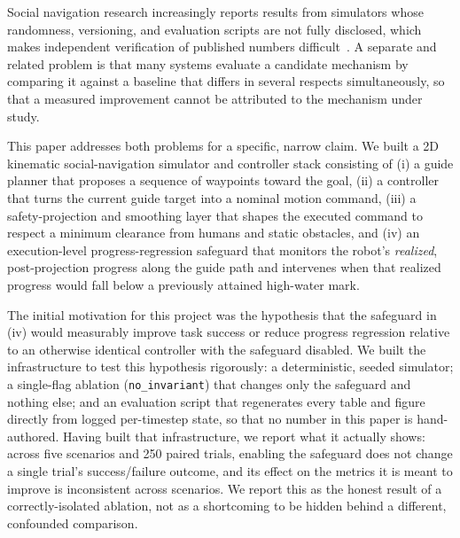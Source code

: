 \documentclass[conference,letterpaper,10pt]{ieeeconf}
\begin{document}
Social navigation research increasingly reports results from simulators
whose randomness, versioning, and evaluation scripts are not fully
disclosed, which makes independent verification of published numbers
difficult~\cite{reproducibility_crisis}. A separate and related problem is
that many systems evaluate a candidate mechanism by comparing it against a
baseline that differs in several respects simultaneously, so that a
measured improvement cannot be attributed to the mechanism under study.

This paper addresses both problems for a specific, narrow claim. We built
a 2D kinematic social-navigation simulator and controller stack consisting
of (i) a guide planner that proposes a sequence of waypoints toward the
goal, (ii) a controller that turns the current guide target into a nominal
motion command, (iii) a safety-projection and smoothing layer that shapes
the executed command to respect a minimum clearance from humans and static
obstacles, and (iv) an execution-level progress-regression safeguard that
monitors the robot's \emph{realized}, post-projection progress along the
guide path and intervenes when that realized progress would fall below a
previously attained high-water mark.

The initial motivation for this project was the hypothesis that the
safeguard in (iv) would measurably improve task success or reduce
progress regression relative to an otherwise identical controller with
the safeguard disabled. We built the infrastructure to test this
hypothesis rigorously: a deterministic, seeded simulator; a single-flag
ablation (\texttt{no\_invariant}) that changes only the safeguard and
nothing else; and an evaluation script that regenerates every table and
figure directly from logged per-timestep state, so that no number in this
paper is hand-authored. Having built that infrastructure, we report what
it actually shows: across five scenarios and 250 paired trials, enabling
the safeguard does not change a single trial's success/failure outcome,
and its effect on the metrics it is meant to improve is inconsistent
across scenarios. We report this as the honest result of a
correctly-isolated ablation, not as a shortcoming to be hidden behind a
different, confounded comparison.
\end{document}
